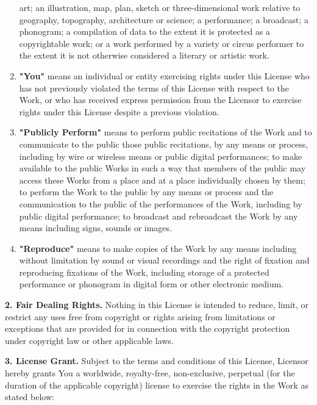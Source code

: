 \begin{enumerate}
  art; an illustration, map, plan, sketch or three-dimensional work
  relative to geography, topography, architecture or science; a
  performance; a broadcast; a phonogram; a compilation of data to the
  extent it is protected as a copyrightable work; or a work performed
  by a variety or circus performer to the extent it is not otherwise
  considered a literary or artistic work.
\item
  \textbf{"You"} means an individual or entity exercising rights
  under this License who has not previously violated the terms of
  this License with respect to the Work, or who has received express
  permission from the Licensor to exercise rights under this License
  despite a previous violation.
\item
  \textbf{"Publicly Perform"} means to perform public recitations of
  the Work and to communicate to the public those public recitations,
  by any means or process, including by wire or wireless means or
  public digital performances; to make available to the public Works
  in such a way that members of the public may access these Works
  from a place and at a place individually chosen by them; to perform
  the Work to the public by any means or process and the
  communication to the public of the performances of the Work,
  including by public digital performance; to broadcast and
  rebroadcast the Work by any means including signs, sounds or
  images.
\item
  \textbf{"Reproduce"} means to make copies of the Work by any means
  including without limitation by sound or visual recordings and the
  right of fixation and reproducing fixations of the Work, including
  storage of a protected performance or phonogram in digital form or
  other electronic medium.
\end{enumerate}
\textbf{2. Fair Dealing Rights.} Nothing in this License is
intended to reduce, limit, or restrict any uses free from copyright
or rights arising from limitations or exceptions that are provided
for in connection with the copyright protection under copyright law
or other applicable laws.

\textbf{3. License Grant.} Subject to the terms and conditions of
this License, Licensor hereby grants You a worldwide, royalty-free,
non-exclusive, perpetual (for the duration of the applicable
copyright) license to exercise the rights in the Work as stated
below:


